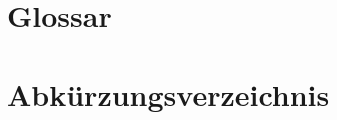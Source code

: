\documentclass[12pt]{article} %
\title{\myTitle}
\author{\myAuthor}
\begin{document}
	\setcounter{secnumdepth}{0}
	\maketitle %
	\thispagestyle{empty}
	\newpage
	
	\tableofcontents
	\clearpage
	
	\listoffigures
	\newpage
	\clearpage
	
	\listoftables
	\newpage
	
	
	\section{Glossar}
	\label{sec:Glossar}
	\glossar
	\glossarycommand
	\newpage
	
	\section{Abkürzungsverzeichnis}
	\label{sec:abkuerzungsverzeichnis}
	\abkuerzungsverzeichnis
	\newpage
	
	\setcounter{secnumdepth}{1}
	\einleitung
	
	\projektplanung
	
	\analysephase
	
	\entwurfsphase
	
	\implementierungsphase
	
	\abnahmephase
	
	\dokumentation
	
	\fazit
	
	\quellenverzeichnis
	\pagebreak
	
	
	\anhang
	\pagebreak
	
\printglossaries
{}
\end{document}
